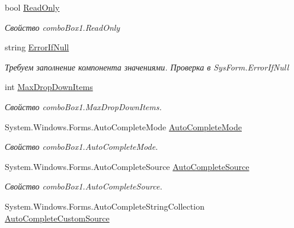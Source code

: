 \begin{DoxyCompactItemize}
\begin{DoxyCompactList}
\end{DoxyCompactList}\item 
bool \mbox{\hyperlink{class_f_b_a_1_1_sys_d_b_edit_a5144c4740f3a30ba8d3243bc533a968b}{Read\+Only}}
\begin{DoxyCompactList}\small\item\em Свойство combo\+Box1.\+Read\+Only \end{DoxyCompactList}\item 
string \mbox{\hyperlink{class_f_b_a_1_1_sys_d_b_edit_a7931890e8811bb09e4c157de9758e091}{Error\+If\+Null}}
\begin{DoxyCompactList}\small\item\em Требуем заполнение компонента значениями. Проверка в Sys\+Form.\+Error\+If\+Null \end{DoxyCompactList}\item 
int \mbox{\hyperlink{class_f_b_a_1_1_sys_d_b_edit_a94f3cdf712fd68883b1cad152efdbcda}{Max\+Drop\+Down\+Items}}
\begin{DoxyCompactList}\small\item\em Свойство combo\+Box1.\+Max\+Drop\+Down\+Items. \end{DoxyCompactList}\item 
System.\+Windows.\+Forms.\+Auto\+Complete\+Mode \mbox{\hyperlink{class_f_b_a_1_1_sys_d_b_edit_ae85d47cfa67babb1396c9f3e687ea64f}{Auto\+Complete\+Mode}}
\begin{DoxyCompactList}\small\item\em Свойство combo\+Box1.\+Auto\+Complete\+Mode. \end{DoxyCompactList}\item 
System.\+Windows.\+Forms.\+Auto\+Complete\+Source \mbox{\hyperlink{class_f_b_a_1_1_sys_d_b_edit_afd35d2743464ba85a8619518aea516ee}{Auto\+Complete\+Source}}
\begin{DoxyCompactList}\small\item\em Свойство combo\+Box1.\+Auto\+Complete\+Source. \end{DoxyCompactList}\item 
System.\+Windows.\+Forms.\+Auto\+Complete\+String\+Collection \mbox{\hyperlink{class_f_b_a_1_1_sys_d_b_edit_af7911aeab68cb2446e182a21e8bb1b18}{Auto\+Complete\+Custom\+Source}}

\end{DoxyCompactItemize}
